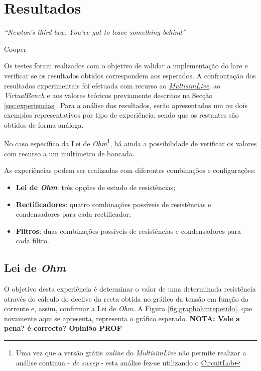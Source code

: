 \label{Capítulo5}
\chapter{Resultados}
\begin{center}
    \textit{``Newton's third law. You've got to leave something behind''}
     
     Cooper
\end{center}
Os testes foram realizados com o objetivo de validar a implementação do \acrshort{lare} e verificar se os resultados obtidos correspondem aos esperados. A confrontação dos resultados experimentais foi efetuada com recurso ao \href{https://www.multisim.com}{\textit{MultisimLive}}, ao \textit{VirtualBench} e aos valores teóricos previamente descritos na Secção \ref{sec:experiencias}. Para a análise dos resultados, serão apresentados um ou dois exemplos representativos por tipo de experiência, sendo que os restantes são obtidos de forma análoga.

No caso específico da Lei de \textit{Ohm}\footnote{Uma vez que a versão grátis \textit{online} do \textit{MultisimLive} não permite realizar a análise continua - \textit{dc sweep} - esta análise fez-se utilizando o \href{https://www.circuitlab.com/}{CircuitLab}}, há ainda a possibilidade de verificar os valores com recurso a um multímetro de bancada.

As experiências podem ser realizadas com diferentes combinações e configurações:
\begin{itemize}
	\item \textbf{Lei de \textit{Ohm}}: três opções de estudo de resistências;
	\item \textbf{Rectificadores}: quatro combinações possíveis de resistências e condensadores para cada rectificador;
	\item \textbf{Filtros}: duas combinações possiveis de resistências e condensadores para cada filtro.
\end{itemize}

\section{Lei de \textit{Ohm}}
\label{sec:resultados_lei_de_ohm}
O objetivo desta experiência é determinar o valor de uma determinada resistência através do cálculo do declive da recta obtida no gráfico da tensão em função da corrente e, assim, confirmar a Lei de \textit{Ohm}. A Figura \ref{fig:graphohmrepetido}, que novamente aqui se apresenta, representa o gráfico esperado. \textbf{NOTA: Vale a pena? é correcto? Opinião PROF}

